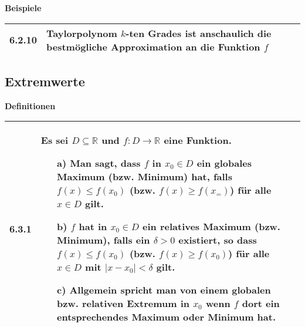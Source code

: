     \noindent
    \textbf{Beispiele}
    \begin{table}[H]
    \begin{tabularx}{\textwidth}{X m{16cm}}
        \toprule

        6.2.10& Taylorpolynom $k$-ten Grades ist anschaulich die bestmögliche Approximation an die Funktion $f$ \\

        \bottomrule
    \end{tabularx}
    \end{table}

\subsection{Extremwerte}

    \noindent
    \textbf{Definitionen}
    \begin{table}[H]  
    \begin{tabularx}{\textwidth}{X m{16cm}}
        \toprule

        6.3.1 & Es sei $D \subseteq \mathbb{R}$ und $f: D \rightarrow \mathbb{R}$ eine Funktion.
                \begin{itemize}
                    \item[a)] Man sagt, dass $f$ in $x_0 \in D$ ein \textbf{globales Maximum} (bzw. Minimum) hat, falls $f(x) \leq f(x_0)$
                                (bzw. $f(x) \geq f(x_=)$) für alle $x \in D$ gilt.
                    \item[b)] $f$ hat in $x_0 \in D$ ein \textbf{relatives Maximum} (bzw. Minimum), falls ein $\delta > 0$ existiert, so dass $f(x) \leq f(x_0)$
                                (bzw. $f(x) \geq f(x_0)$) für alle $x \in D$ mit $|x-x_0| < \delta$ gilt.
                    \item[c)] Allgemein spricht man von einem globalen bzw. relativen \textbf{Extremum} in $x_0$ wenn $f$ dort ein entsprechendes
                                Maximum oder Minimum hat.
                \end{itemize} \\

        \bottomrule

    \end{tabularx}
    \end{table}

